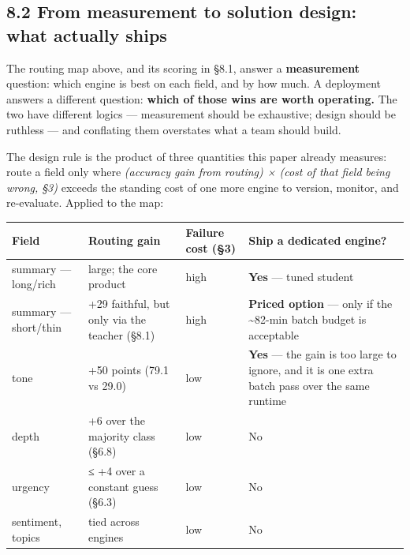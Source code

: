 \documentclass[11pt]{article}
\begin{document}
\subsection{8.2 From measurement to solution design: what actually
ships}\label{from-measurement-to-solution-design-what-actually-ships}

The routing map above, and its scoring in §8.1, answer a
\textbf{measurement} question: which engine is best on each field, and
by how much. A deployment answers a different question: \textbf{which of
those wins are worth operating.} The two have different logics ---
measurement should be exhaustive; design should be ruthless --- and
conflating them overstates what a team should build.

The design rule is the product of three quantities this paper already
measures: route a field only where \emph{(accuracy gain from routing) ×
(cost of that field being wrong, §3)} exceeds the standing cost of one
more engine to version, monitor, and re-evaluate. Applied to the map:

\begin{longtable}[]{@{}
  >{\raggedright\arraybackslash}p{}
  >{\raggedright\arraybackslash}p{}
  >{\raggedright\arraybackslash}p{}
  >{\raggedright\arraybackslash}p{}@{}}
\toprule\noalign{}
\begin{minipage}[b]{\linewidth}\raggedright
Field
\end{minipage} & \begin{minipage}[b]{\linewidth}\raggedright
Routing gain
\end{minipage} & \begin{minipage}[b]{\linewidth}\raggedright
Failure cost (§3)
\end{minipage} & \begin{minipage}[b]{\linewidth}\raggedright
Ship a dedicated engine?
\end{minipage} \\
\midrule\noalign{}
\endhead
\bottomrule\noalign{}
\endlastfoot
summary --- long/rich & large; the core product & high & \textbf{Yes}
--- tuned student \\
summary --- short/thin & +29 faithful, but only via the teacher (§8.1) &
high & \textbf{Priced option} --- only if the \textasciitilde82-min
batch budget is acceptable \\
tone & +50 points (79.1 vs 29.0) & low & \textbf{Yes} --- the gain is
too large to ignore, and it is one extra batch pass over the same
runtime \\
depth & +6 over the majority class (§6.8) & low & No \\
urgency & ≤ +4 over a constant guess (§6.3) & low & No \\
sentiment, topics & tied across engines & low & No \\
\end{longtable}
\end{document}

